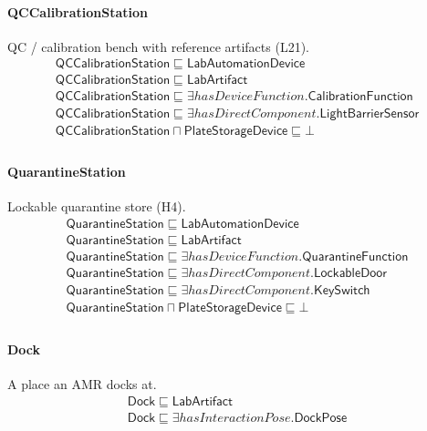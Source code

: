 \documentclass[10pt]{article}
\begin{document}
\paragraph{QCCalibrationStation} QC / calibration bench with reference artifacts (L21).
\[\begin{array}{l}
\mathsf{QCCalibrationStation} \sqsubseteq  \mathsf{LabAutomationDevice} \\
\mathsf{QCCalibrationStation} \sqsubseteq  \mathsf{LabArtifact} \\
\mathsf{QCCalibrationStation} \sqsubseteq  \exists \mathit{hasDeviceFunction}.\mathsf{CalibrationFunction} \\
\mathsf{QCCalibrationStation} \sqsubseteq  \exists \mathit{hasDirectComponent}.\mathsf{LightBarrierSensor} \\
\mathsf{QCCalibrationStation} \sqcap  \mathsf{PlateStorageDevice} \sqsubseteq  \bot  \\
\end{array}\]
\paragraph{QuarantineStation} Lockable quarantine store (H4).
\[\begin{array}{l}
\mathsf{QuarantineStation} \sqsubseteq  \mathsf{LabAutomationDevice} \\
\mathsf{QuarantineStation} \sqsubseteq  \mathsf{LabArtifact} \\
\mathsf{QuarantineStation} \sqsubseteq  \exists \mathit{hasDeviceFunction}.\mathsf{QuarantineFunction} \\
\mathsf{QuarantineStation} \sqsubseteq  \exists \mathit{hasDirectComponent}.\mathsf{LockableDoor} \\
\mathsf{QuarantineStation} \sqsubseteq  \exists \mathit{hasDirectComponent}.\mathsf{KeySwitch} \\
\mathsf{QuarantineStation} \sqcap  \mathsf{PlateStorageDevice} \sqsubseteq  \bot  \\
\end{array}\]
\paragraph{Dock} A place an AMR docks at.
\[\begin{array}{l}
\mathsf{Dock} \sqsubseteq  \mathsf{LabArtifact} \\
\mathsf{Dock} \sqsubseteq  \exists \mathit{hasInteractionPose}.\mathsf{DockPose} \\
\end{array}\]
\end{document}
